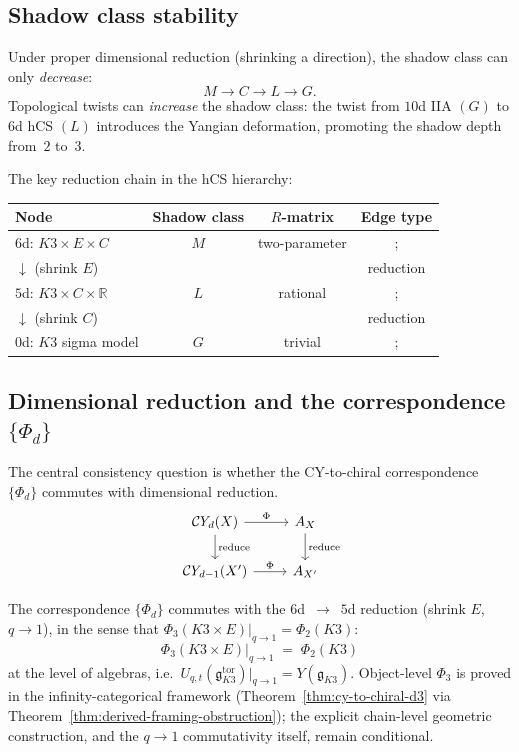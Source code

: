 \subsection{Shadow class stability}
\label{sec:shadow-class-stability}

Under proper dimensional reduction (shrinking a direction), the shadow class
can only \emph{decrease}:
\[
 M \to C \to L \to G.
\]
Topological twists can \emph{increase} the shadow class: the twist from
$10$d IIA $(G)$ to $6$d hCS $(L)$ introduces the Yangian deformation,
promoting the shadow depth from~$2$ to~$3$.

The key reduction chain in the hCS hierarchy:
\begin{center}
\renewcommand{\arraystretch}{1.3}
\begin{tabular}{lccc}
\hline
\textbf{Node} & \textbf{Shadow class} & \textbf{$R$-matrix} & \textbf{Edge type} \\
\hline
$6$d: $K3 \times E \times C$ & $M$ & two-parameter &; \\
$\downarrow$ (shrink $E$) & & & reduction \\
$5$d: $K3 \times C \times \mathbb{R}$ & $L$ & rational &; \\
$\downarrow$ (shrink $C$) & & & reduction \\
$0$d: $K3$ sigma model & $G$ & trivial &; \\
\hline
\end{tabular}
\end{center}

\subsection{Dimensional reduction and the correspondence \texorpdfstring{$\{\Phi_d\}$}{Phi-d}}
\label{sec:dimred-commutativity}

The central consistency question is whether the CY-to-chiral
correspondence $\{\Phi_d\}$ commutes with dimensional reduction.
\[
\begin{tikzcd}
 \mathcal{C}\!\mathit{Y}_d(X) \ar[r, "\Phi"] \ar[d, "\text{reduce}"]
 & A_X \ar[d, "\text{reduce}"] \\
 \mathcal{C}\!\mathit{Y}_{d-1}(X') \ar[r, "\Phi"]
 & A_{X'}
\end{tikzcd}
\]

\begin{conjecture}
\label{conj:compactification-commutativity}
\ClaimStatusConjectured
The correspondence $\{\Phi_d\}$ commutes with the
$6$d~$\to$~$5$d reduction (shrink $E$, $q \to 1$), in the sense that
$\Phi_3(K3 \times E)|_{q \to 1} = \Phi_2(K3)$:
\[
 \Phi_3(K3 \times E)\big|_{q \to 1}
 \;=\;
 \Phi_2(K3)
\]
at the level of algebras, i.e.\
$U_{q,t}(\mathfrak{g}_{K3}^{\mathrm{tor}})\big|_{q \to 1}
= Y(\mathfrak{g}_{K3})$. Object-level $\Phi_3$ is proved in the
infinity-categorical framework
(Theorem~\ref{thm:cy-to-chiral-d3} via
Theorem~\ref{thm:derived-framing-obstruction}); the explicit
chain-level geometric construction, and the $q \to 1$ commutativity
itself, remain conditional.
\end{conjecture}

